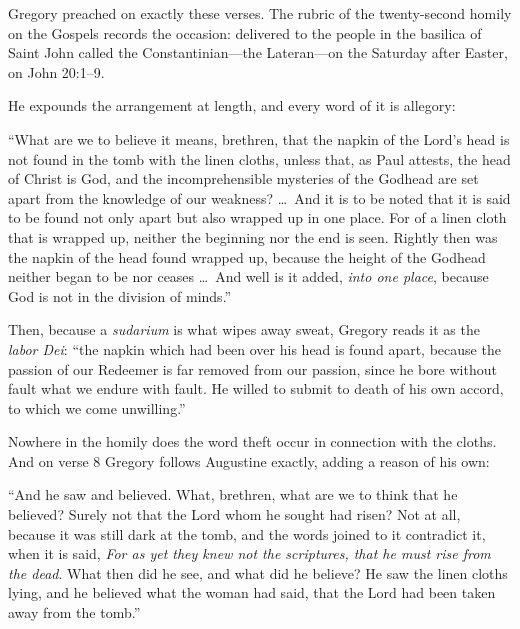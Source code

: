 Gregory preached on exactly these verses. The rubric of the twenty-second
homily on the Gospels records the occasion: delivered to the people in the
basilica of Saint John called the Constantinian---the Lateran---on the Saturday
after Easter, on John 20:1--9.

He expounds the arrangement at length, and every word of it is allegory:

\begin{studyframe}\small
``What are we to believe it means, brethren, that the napkin of the Lord's head
is not found in the tomb with the linen cloths, unless that, as Paul attests,
the head of Christ is God, and the incomprehensible mysteries of the Godhead
are set apart from the knowledge of our weakness? \ldots\ And it is to be noted
that it is said to be found not only apart but also wrapped up in one place.
For of a linen cloth that is wrapped up, neither the beginning nor the end is
seen. Rightly then was the napkin of the head found wrapped up, because the
height of the Godhead neither began to be nor ceases \ldots\ And well is it
added, \emph{into one place}, because God is not in the division of
minds.''
\end{studyframe}

Then, because a \emph{sudarium} is what wipes away sweat, Gregory reads it as
the \emph{labor Dei}: ``the napkin which had been over his head is found apart,
because the passion of our Redeemer is far removed from our passion, since he
bore without fault what we endure with fault. He willed to submit to death of
his own accord, to which we come unwilling.''

Nowhere in the homily does the word theft occur in connection with the cloths.
And on verse 8 Gregory follows Augustine exactly, adding a reason of his own:

\begin{studyframe}\small
``And he saw and believed. What, brethren, what are we to think that he
believed? Surely not that the Lord whom he sought had risen? Not at all,
because it was still dark at the tomb, and the words joined to it contradict
it, when it is said, \emph{For as yet they knew not the scriptures, that he
must rise from the dead}. What then did he see, and what did he believe? He saw
the linen cloths lying, and he believed what the woman had said, that the Lord
had been taken away from the tomb.''
\end{studyframe}

